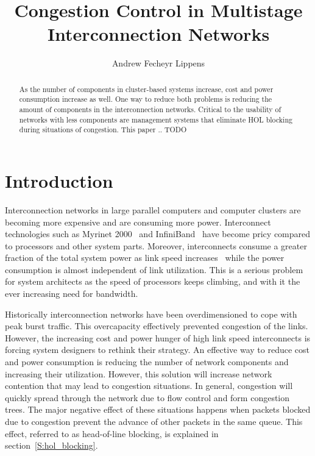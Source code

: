 \documentclass[12pt]{article}
\title{Congestion Control in Multistage Interconnection Networks}
\author{Andrew Fecheyr Lippens}
\date{}
\begin{document}


\newpage
\mbox{}

\maketitle

\begin{abstract}
As the number of components in cluster-based systems increase, cost and power consumption increase as well. One way to reduce both problems is reducing the amount of components in the interconnection networks. Critical to the usability of networks with less components are management systems that eliminate HOL blocking during situations of congestion. This paper ..
TODO
\end{abstract}

\setcounter{tocdepth}{2}

\begin{tableofcontents}
\end{tableofcontents}

\newpage

\addtolength{\parskip}{0.5\baselineskip}

\section{Introduction}\label{C:intro}
Interconnection networks in large parallel computers and computer clusters are becoming more expensive and are consuming more power. Interconnect technologies such as Myrinet 2000~\cite{myrinet} and InfiniBand~\cite{infiniband} have become pricy compared to processors and other system parts. Moreover, interconnects consume a greater fraction of the total system power as link speed increases~\cite{SPJ03} while the power consumption is almost independent of link utilization. This is a serious problem for system architects as the speed of processors keeps climbing, and with it the ever increasing need for bandwidth.

Historically interconnection networks have been overdimensioned to cope with peak burst traffic. This overcapacity effectively prevented congestion of the links. However, the increasing cost and power hunger of high link speed interconnects is forcing system designers to rethink their strategy. An effective way to reduce cost and power consumption is reducing the number of network components and increasing their utilization. However, this solution will increase network contention that may lead to congestion situations. In general, congestion will quickly spread through the network due to flow control and form congestion trees. The major negative effect of these situations happens when packets blocked due to congestion prevent the advance of other packets in the same queue. This effect, referred to as head-of-line blocking, is explained in section~\ref{S:hol_blocking}.
\end{document}
